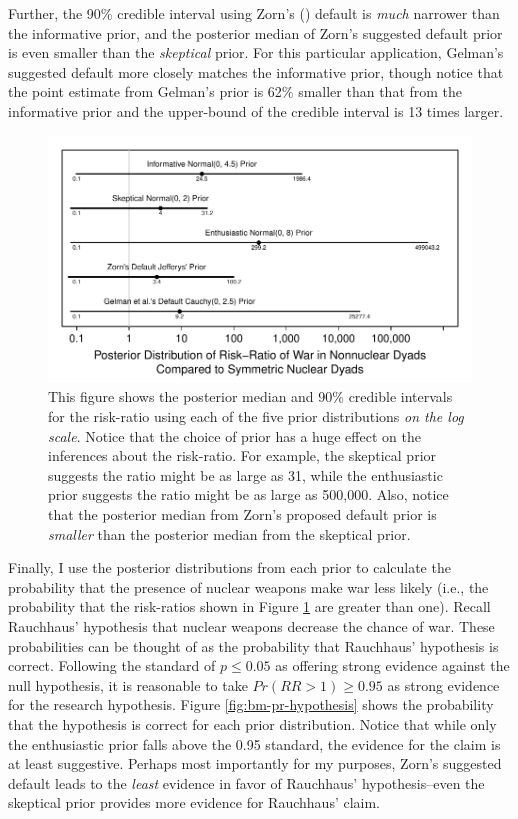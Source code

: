 \documentclass[12pt]{article}
\begin{document}
Further, the 90\% credible interval using Zorn's (\citeyear{Zorn2005}) default is \emph{much} narrower than the informative prior, and the posterior median of Zorn's suggested default prior is even smaller than the \emph{skeptical} prior. 
For this particular application, Gelman's suggested default more closely matches the informative prior, though notice that the point estimate from Gelman's prior is 62\% smaller than that from the informative prior and the upper-bound of the credible interval is 13 times larger.

\begin{figure}[H]
\begin{center}
\includegraphics[scale = .8]{figs/bm-rr.pdf}
\caption{This figure shows the posterior median and 90\% credible intervals for the risk-ratio using each of the five prior distributions \emph{on the log scale}. 
Notice that the choice of prior has a huge effect on the inferences about the risk-ratio. 
For example, the skeptical prior suggests the ratio might be as large as 31, while the enthusiastic prior suggests the ratio might be as large as 500,000. 
Also, notice that the posterior median from Zorn's proposed default prior is \emph{smaller} than the posterior median from the skeptical prior.}\label{fig:bm-rr}
\end{center}
\end{figure}

Finally, I use the posterior distributions from each prior to calculate the probability that the presence of nuclear weapons make war less likely (i.e., the probability that the risk-ratios shown in Figure \ref{fig:bm-rr} are greater than one). 
Recall Rauchhaus' hypothesis that nuclear weapons decrease the chance of war. 
These probabilities can be thought of as the probability that Rauchhaus' hypothesis is correct. 
Following the standard of $p \leq 0.05$ as offering strong evidence against the null hypothesis, it is reasonable to take $Pr(RR > 1) \geq 0.95$ as strong evidence for the research hypothesis. 
Figure \ref{fig:bm-pr-hypothesis} shows the probability that the hypothesis is correct for each prior distribution. 
Notice that while only the enthusiastic prior falls above the 0.95 standard, the evidence for the claim is at least suggestive. 
Perhaps most importantly for my purposes, Zorn's suggested default leads to the \emph{least} evidence in favor of Rauchhaus' hypothesis--even the skeptical prior provides more evidence for Rauchhaus' claim.
\end{document}
